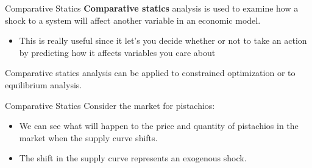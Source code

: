 \documentclass[12pt,t]{beamer}
\begin{document}
\begin{frame}{Comparative Statics}
  \textbf{Comparative statics} analysis is used to examine how a shock to a system will affect another variable in an economic model. 
  
  \begin{itemize}
    \item This is really useful since it let's you decide whether or not to take an action by predicting how it affects variables you care about
  \end{itemize}

  Comparative statics analysis can be applied to constrained optimization or to equilibrium analysis.
\end{frame}

\begin{frame}{Comparative Statics}
  Consider the market for pistachios:

  \begin{itemize}
    \item We can see what will happen to the price and quantity of pistachios in the market when the supply curve shifts.
    \item The shift in the supply curve represents an exogenous shock.
  \end{itemize}
\end{frame}
\end{document}
